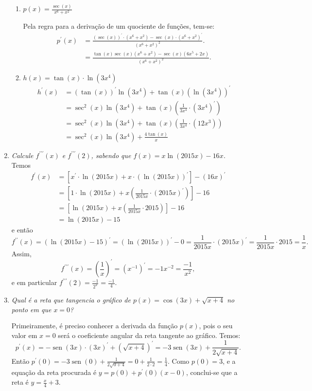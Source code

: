 \documentclass[12pt,a4paper]{article}
\begin{document}
\begin{enumerate}
\begin{enumerate}
\item $p(x) = \frac{\sec(x)}{x^6 + x^2}$

Pela regra para a derivação de um quociente de funções, tem-se:
\begin{align*}
  p^\prime(x)
& = \frac{(\sec(x))^\prime \cdot (x^6 + x^2) - \sec(x) \cdot (x^6 + x^2)^\prime }{(x^6 + x^2)^2}.\\
& = \frac{\tan(x)\sec(x) (x^6 + x^2) - \sec(x) (6x^5 + 2x) }{(x^6 + x^2)^2}.
\end{align*}

\item $h(x) = \tan(x) \cdot \ln(3x^4)$
\begin{align*}
  h^\prime(x)
& = ( \tan(x) )^\prime \ln(3x^4) + \tan(x) ( \ln(3x^4) )^\prime \\
& = \sec^2(x) \ln(3x^4) + \tan(x) \left( \frac{1}{3x^4} \cdot (3x^4)^\prime \right) \\
& = \sec^2(x) \ln(3x^4) + \tan(x) \left( \frac{1}{3x^4} \cdot (12x^3) \right) \\
& = \sec^2(x) \ln(3x^4) + \frac{4 \tan(x)}{x}
\end{align*}
\end{enumerate}


\item \textit{ Calcule $f^{\prime\prime\prime}(x)$ e $f^{\prime\prime\prime}(2)$, sabendo que $f(x) = x \ln( 2015x ) - 16x$. } Temos
\begin{align*}
  f^\prime(x)
& = \left[x^\prime \cdot \ln( 2015x ) + x \cdot (\ln( 2015x ))^\prime \right] - (16x)^\prime \\
& = \left[1 \cdot \ln( 2015x ) + x\left( \frac{1}{2015x} \cdot (2015x)^\prime \right)\right] - 16 \\
& = \left[\ln( 2015x ) + x\left( \frac{1}{2015x} \cdot 2015 \right)\right] - 16 \\
& = \ln( 2015x ) - 15
\end{align*}
e então
\[
f^{\prime\prime}(x)
= (\ln( 2015x ) - 15)^\prime
= ( \ln( 2015x ) )^\prime - 0
= \frac{1}{2015x} \cdot (2015x)^\prime
= \frac{1}{2015x} \cdot 2015
= \frac{1}{x}.
\]
Assim,
\[
f^{\prime\prime\prime}(x)
= \left( \frac{1}{x} \right)^\prime
= (x^{-1})^\prime
= -1x^{-2}
= \frac{-1}{x^2},
\]
e em particular $f^{\prime\prime\prime}(2) = \frac{-1}{2^2} = \frac{-1}{4}$.
 
\item \textit{ Qual é a reta que tangencia o gráfico de $p(x) = \cos(3x) + \sqrt{x + 4}$ no ponto em que $x = 0$? }

Primeiramente, é preciso conhecer a derivada da função $p(x)$, pois o seu valor em $x=0$ será o coeficiente angular da reta tangente ao gráfico. Temos:
\[
p^\prime(x)
= -\operatorname{sen}(3x) \cdot (3x)^\prime + ( \sqrt{x + 4} )^\prime
= -3 \operatorname{sen}(3x) + \frac{1}{2\sqrt{x + 4}}.
\]
Então $p^\prime(0)
= -3 \operatorname{sen}(0) + \frac{1}{2\sqrt{0 + 4}}
= 0 + \frac{1}{2 \cdot 2}
= \frac{1}{4}.$
Como $p(0) = 3$, e a equação da reta procurada é $y = p(0) + p^\prime(0) (x - 0)$, conclui-se que a reta é $y = \frac{x}{4} + 3$.


\end{enumerate}
\end{document}
